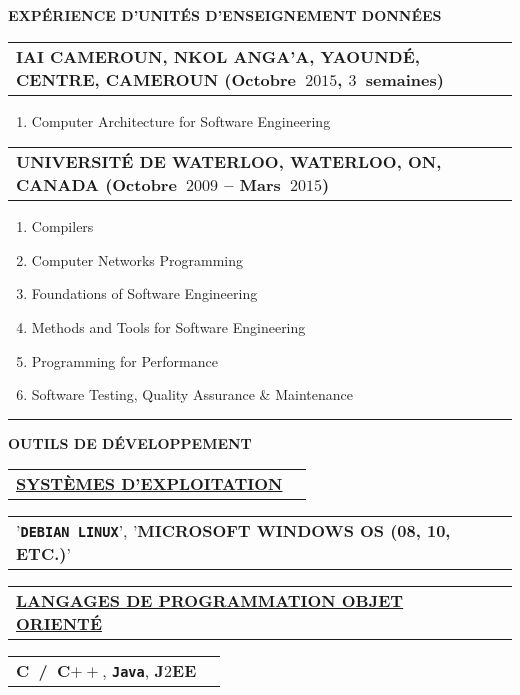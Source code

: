 \documentclass[9pt,a4paper]{article} %
\makeatletter
\newcommand{\headerrow}[2]
{\begin{tabular*}{\linewidth}{l@{\extracolsep{\fill}}r}
	#1 &
	#2 \\
\end{tabular*}}
\newcommand{\headerrowONE}[1]{\headerrow{#1}{}}
\newcommand{\cplusplus}{C$++$\xspace}
\newcommand{\java}{\texttt{Java}\xspace}
\newcommand{\jtwoee}{J$2$EE\xspace}
\newcommand{\yerothdebian}{\texttt{DEBIAN LINUX}\xspace}
\makeatother
\begin{document}
\begin{center}
{\large \textbf{EXPÉRIENCE D'UNITÉS D'ENSEIGNEMENT DONNÉES}}
\end{center}

\vspace{0.5em}

\headerrowONE{\textbf{IAI CAMEROUN, NKOL ANGA'A, YAOUNDÉ, CENTRE, CAMEROUN (Octobre~$2015$, $3$~semaines)}}
\begin{enumerate}
	\item Computer Architecture for Software Engineering
\end{enumerate}

\vspace{0.5em}

\headerrowONE{\textbf{UNIVERSITÉ DE WATERLOO, WATERLOO, ON, CANADA (Octobre~$2009$ -- Mars~$2015$)}}

\begin{enumerate}
	\itemsep -0.3em
	\item Compilers
	\item Computer Networks Programming
	\item Foundations of Software Engineering
	\item Methods and Tools for Software Engineering
	\item Programming for Performance
	\item Software Testing, Quality Assurance \& Maintenance
\end{enumerate}


\vspace{1em}

\hrule
\begin{center}
{\large \textbf{OUTILS DE DÉVELOPPEMENT}}
\end{center}

\vspace{0.5em}

\headerrowONE{\textbf{\underline{SYSTÈMES D'EXPLOITATION}}}
\headerrowONE{'\textbf{\yerothdebian}', '\textbf{MICROSOFT WINDOWS OS (08, 10, ETC.)}'}

\vspace{0.3em}

\headerrowONE{\textbf{\underline{LANGAGES DE PROGRAMMATION OBJET ORIENTÉ}}}
\headerrowONE{\textbf{C~/~\cplusplus}, \textbf{\java}, \textbf{\jtwoee}}

\vspace{0.3em}
\end{document}
